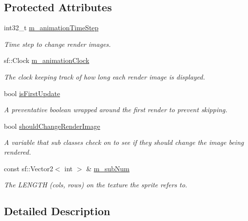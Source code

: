 \subsection*{Protected Attributes}
\begin{DoxyCompactItemize}
\item 
int32\-\_\-t \hyperlink{classengine_1_1CAnimatable_a5ad99730dad31f7b458fa99987970f3c}{m\-\_\-animation\-Time\-Step}
\begin{DoxyCompactList}\small\item\em Time step to change render images. \end{DoxyCompactList}\item 
sf\-::\-Clock \hyperlink{classengine_1_1CAnimatable_ac7041497fc032eb2a6335fc9e68aba1c}{m\-\_\-animation\-Clock}
\begin{DoxyCompactList}\small\item\em The clock keeping track of how long each render image is displayed. \end{DoxyCompactList}\item 
bool \hyperlink{classengine_1_1CAnimatable_a34c1d2a0bae733f78b17f0cc527379e8}{is\-First\-Update}
\begin{DoxyCompactList}\small\item\em A preventative boolean wrapped around the first render to prevent skipping. \end{DoxyCompactList}\item 
bool \hyperlink{classengine_1_1CAnimatable_a1733e847840f52f15958546d1eb21810}{should\-Change\-Render\-Image}
\begin{DoxyCompactList}\small\item\em A variable that sub classes check on to see if they should change the image being rendered. \end{DoxyCompactList}\item 
const sf\-::\-Vector2$<$ int $>$ \& \hyperlink{classengine_1_1CAnimatable_a75150745354ce35d66711d6613eb3be6}{m\-\_\-sub\-Num}
\begin{DoxyCompactList}\small\item\em The L\-E\-N\-G\-T\-H (cols, rows) on the texture the sprite refers to. \end{DoxyCompactList}\end{DoxyCompactItemize}


\subsection{Detailed Description}


